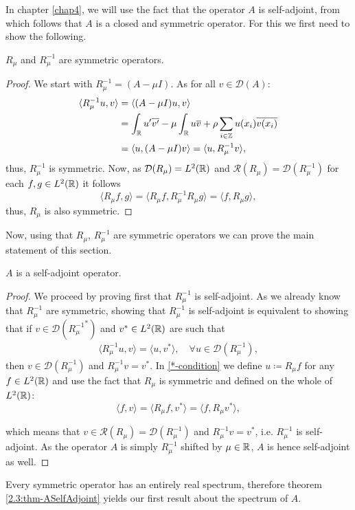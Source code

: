 In chapter \ref{chap4}, we will use the fact that the operator $A$ is self-adjoint, from which follows that $A$ is a closed and symmetric operator. For this we first need to show the following.
\begin{theorem} \label{2.2:thm-RmuSymmetric}
	$R_{\mu}$ and $R_{\mu}^{-1}$ are symmetric operators.
	
	\begin{proof}
		We start with $R_{\mu}^{-1} = (A - \mu I)$. As for all $v \in \mathcal{D}(A)$:
			\begin{align*}
				\langle R_{\mu}^{-1} u, v \rangle & = \langle (A - \mu I) u, v \rangle \\
					& = \int_{\mathbb{R}} u'\overline{v'} -  \mu \int_{\mathbb{R}} u \overline{v} + \rho \sum_{i \in \mathbb{Z}} u(x_{i}) \overline{v(x_{i})} \\
					& = \langle u, (A - \mu I) v \rangle = \langle u,  R_{\mu}^{-1} v \rangle,
			\end{align*}
		thus, $R_{\mu}^{-1}$ is symmetric. Now, as $\mathcal{D}(R_{\mu}) = L^{2}(\mathbb{R})$ and $\mathcal{R}(R_{\mu}) = \mathcal{D}(R_{\mu}^{-1})$ for each $f, g \in L^{2}(\mathbb{R})$ it follows
		\[  \langle R_{\mu} f, g \rangle =  \langle R_{\mu} f, R_{\mu}^{-1} R_{\mu} g \rangle = \langle f, R_{\mu} g \rangle, \]
		thus, $R_{\mu}$ is also symmetric.
	\end{proof}
\end{theorem}

Now, using that $R_{\mu}$, $R_{\mu}^{-1}$ are symmetric operators we can prove the main statement of this section. 

\begin{theorem} \label{2.3:thm-ASelfAdjoint}
	$A$ is a self-adjoint operator.
		
	\begin{proof}
		We proceed by proving first that $R_{\mu}^{-1}$ is self-adjoint. As we already know that $R_{\mu}^{-1}$ are symmetric, showing that $R_{\mu}^{-1}$ is self-adjoint is equivalent to showing that if $v \in \mathcal{D}({R_{\mu}^{-1}}^{*})$ and $v^{*} \in L^{2}(\mathbb{R})$ are such that
		\begin{align}
			\langle R_{\mu}^{-1} u, v \rangle = \langle u, v^{*} \rangle, \quad \forall u \in \mathcal{D}(R_{\mu}^{-1}), \label{*-condition}
		\end{align}
		then $v \in \mathcal{D}(R_{\mu}^{-1})$ and $R_{\mu}^{-1} v = v^{*}$.
		In \eqref{*-condition} we define $u \coloneqq R_{\mu} f$ for any $f \in L^{2}(\mathbb{R})$ and use the fact that $R_{\mu}$ is symmetric and defined on the whole of $L^{2}(\mathbb{R})$:
		\[  \langle f, v \rangle = \langle R_{\mu} f, v^{*} \rangle = \langle f, R_{\mu} v^{*} \rangle, \]
		
		which means that $v \in \mathcal{R}(R_{\mu}) = \mathcal{D}(R_{\mu}^{-1})$ and $R_{\mu}^{-1} v = v^{*}$, i.e. $R_{\mu}^{-1}$ is self-adjoint. As the operator $A$ is simply $R_{\mu}^{-1}$ shifted by $\mu \in \mathbb{R}$, $A$ is hence self-adjoint as well.		
	\end{proof}
\end{theorem}

Every symmetric operator has an entirely real spectrum, therefore theorem \ref{2.3:thm-ASelfAdjoint} yields our first result about the spectrum of $A$.